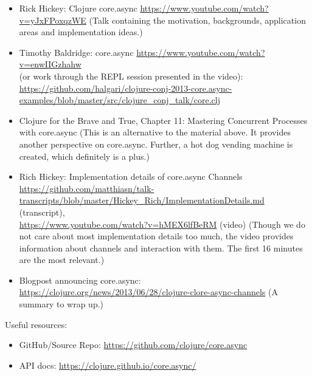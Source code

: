 \documentclass[11pt,a4paper]{article}
\begin{document}
\renewcommand{\labelenumi}{\Alph{enumi}}
\begin{itemize}    
	
	\item Rick Hickey: Clojure core.async \url{https://www.youtube.com/watch?v=yJxFPoxqzWE}
    (Talk containing the motivation, backgrounds, application areas and implementation ideas.) 
	
	\item Timothy Baldridge: core.async \url{https://www.youtube.com/watch?v=enwIIGzhahw} \\
    (or work through the REPL session presented in the video): \url{https://github.com/halgari/clojure-conj-2013-core.async-examples/blob/master/src/clojure_conj_talk/core.clj}
	
    \item Clojure for the Brave and True, Chapter 11: Mastering Concurrent Processes with core.async
        (This is an alternative to the material above. It provides another perspective on core.async. Further, a hot dog vending machine is created, which definitely is a plus.)
    
    \item Rich Hickey: Implementation details of core.async Channels \url{https://github.com/matthiasn/talk-transcripts/blob/master/Hickey_Rich/ImplementationDetails.md} (transcript),\\
        \url{https://www.youtube.com/watch?v=hMEX6lfBeRM} (video)
        (Though we do not care about most implementation details too much, the video provides information about channels and interaction with them. The first 16 minutes are the most relevant.)
    
    \item Blogpost announcing core.async: \\
    \url{https://clojure.org/news/2013/06/28/clojure-clore-async-channels}
        (A summary to wrap up.)
    
\end{itemize} 

Useful resources:

\begin{itemize}
	
	\item GitHub/Source Repo: \url{https://github.com/clojure/core.async}
	
	\item API docs: \url{https://clojure.github.io/core.async/}
\end{itemize}
\end{document}
